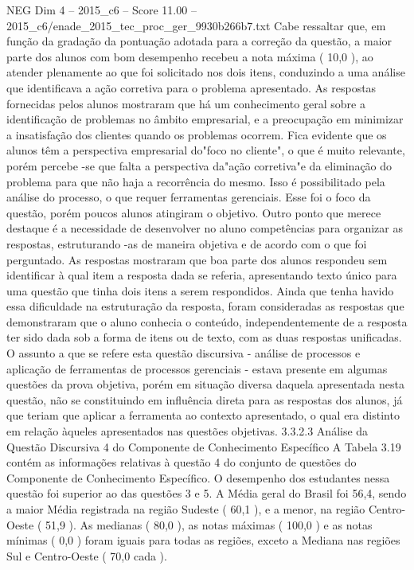 \begin{textsample}{NEG Dim 4 – 2015\_c6 – Score 11.00 – 2015\_c6/enade\_2015\_tec\_proc\_ger\_9930b266b7.txt}
Cabe ressaltar que, em função da gradação da pontuação adotada para a correção da questão, a maior parte dos alunos com bom desempenho recebeu a nota máxima ( 10,0 ), ao atender plenamente ao que foi solicitado nos dois itens, conduzindo a uma análise que identificava a ação corretiva para o problema apresentado.
As respostas fornecidas pelos alunos mostraram que há um conhecimento geral sobre a identificação de problemas no âmbito empresarial, e a preocupação em minimizar a insatisfação dos clientes quando os problemas ocorrem.
Fica evidente que os alunos têm a perspectiva empresarial do"foco no cliente", o que é muito relevante, porém percebe -se que falta a perspectiva da"ação corretiva"e da eliminação do problema para que não haja a recorrência do mesmo.
Isso é possibilitado pela análise do processo, o que requer ferramentas gerenciais.
Esse foi o foco da questão, porém poucos alunos atingiram o objetivo.
Outro ponto que merece destaque é a necessidade de desenvolver no aluno competências para organizar as respostas, estruturando -as de maneira objetiva e de acordo com o que foi perguntado.
As respostas mostraram que boa parte dos alunos respondeu sem identificar à qual item a resposta dada se referia, apresentando texto único para uma questão que tinha dois itens a serem respondidos.
Ainda que tenha havido essa dificuldade na estruturação da resposta, foram consideradas as respostas que demonstraram que o aluno conhecia o conteúdo, independentemente de a resposta ter sido dada sob a forma de itens ou de texto, com as duas respostas unificadas.
O assunto a que se refere esta questão discursiva - análise de processos e aplicação de ferramentas de processos gerenciais - estava presente em algumas questões da prova objetiva, porém em situação diversa daquela apresentada nesta questão, não se constituindo em influência direta para as respostas dos alunos, já que teriam que aplicar a ferramenta ao contexto apresentado, o qual era distinto em relação àqueles apresentados nas questões objetivas. 3.3.2.3 Análise da Questão Discursiva 4 do Componente de Conhecimento Específico A Tabela 3.19 contém as informações relativas à questão 4 do conjunto de questões do Componente de Conhecimento Específico.
O desempenho dos estudantes nessa questão foi superior ao das questões 3 e 5.
A Média geral do Brasil foi 56,4, sendo a maior Média registrada na região Sudeste ( 60,1 ), e a menor, na região Centro-Oeste ( 51,9 ).
As medianas ( 80,0 ), as notas máximas ( 100,0 ) e as notas mínimas ( 0,0 ) foram iguais para todas as regiões, exceto a Mediana nas regiões Sul e Centro-Oeste ( 70,0 cada ).

\end{textsample}
